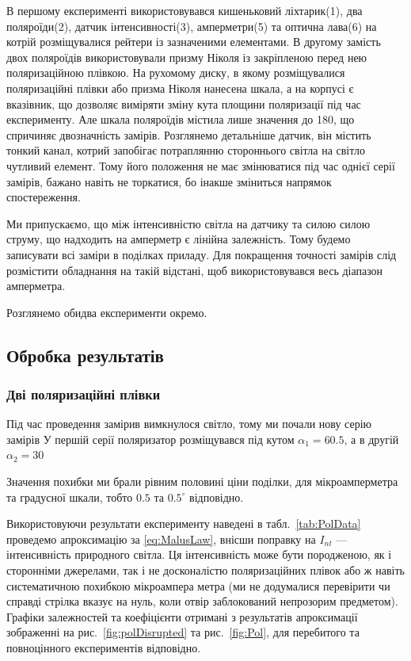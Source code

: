 	                   
	В першому експерименті використовувався кишеньковий ліхтарик(1), два поляроїди(2), датчик інтенсивності(3), амперметри(5) та оптична лава(6) на котрій розміщувалися рейтери із зазначеними елементами. В другому замість двох поляроїдів використовували призму Ніколя із закріпленою перед нею поляризаційною плівкою. На рухомому диску, в якому розміщувалися поляризаційні плівки або призма Ніколя нанесена шкала, а на корпусі є вказівник, що дозволяє виміряти зміну кута площини поляризації під час експерименту. Але шкала поляроїдів містила лише значення до 180, що спричиняє  двозначність замірів. Розглянемо детальніше датчик, він містить тонкий канал, котрий запобігає потраплянню стороннього світла на світло чутливий елемент. Тому його положення не має змінюватися під час однієї серії замірів, бажано навіть не торкатися, бо інакше зміниться напрямок спостереження.
	
	Ми припускаємо, що між інтенсивністю світла на датчику та силою силою струму, що надходить на амперметр є лінійна залежність. Тому будемо записувати всі заміри в поділках приладу. Для покращення точності замірів слід розмістити обладнання на такій відстані, щоб використовувався весь діапазон амперметра.
	
	Розглянемо обидва експерименти окремо.
	
	\subsection{Обробка результатів}
	
	\subsubsection{Дві поляризаційні плівки}
	
	Під час проведення замірив вимкнулося світло, тому ми почали нову серію замірів
	У першій серії поляризатор розміщувався під кутом $\alpha_1=60.5$, а в другій $\alpha_2=30$
	
	Значення похибки ми брали рівним половині ціни поділки, для мікроамперметра та градусної шкали, тобто $0.5$ та $0.5^{\circ}$ відповідно.
	
	
	
	
	
	Використовуючи результати експерименту наведені в табл.~\ref{tab:PolData} проведемо апроксимацію за \eqref{eq:MalusLaw}, внісши поправку на $I_{nt}$ --- інтенсивність природного світла. Ця інтенсивність може бути породженою, як і сторонніми джерелами, так і не досконалістю поляризаційних плівок або ж навіть систематичною похибкою мікроампера метра (ми не додумалися перевірити чи справді стрілка вказує на нуль, коли отвір заблокований непрозорим предметом). Графіки залежностей та коефіцієнти отримані з результатів апроксимації зображенні на рис.~\ref{fig:polDisrupted} та рис.~\ref{fig:Pol}, для перебитого та повноцінного експериментів відповідно.
	

